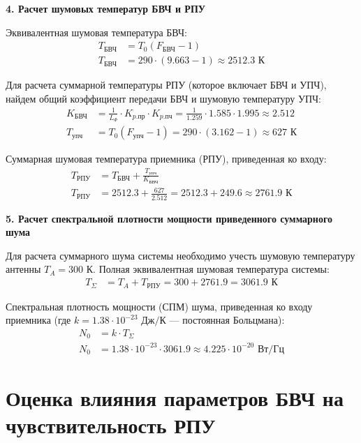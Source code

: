 \vspace{1em}
\textbf{4. Расчет шумовых температур БВЧ и РПУ}

Эквивалентная шумовая температура БВЧ:
\begin{align*}
T_{\text{БВЧ}} &= T_0 (F_{\text{БВЧ}} - 1) \\
T_{\text{БВЧ}} &= 290 \cdot (9.663 - 1) \approx 2512.3 \text{ К}
\end{align*}

Для расчета суммарной температуры РПУ (которое включает БВЧ и УПЧ), найдем общий коэффициент передачи БВЧ и шумовую температуру УПЧ:
\begin{align*}
K_{\text{БВЧ}} &= \frac{1}{L_{\Phi}} \cdot K_{p.\text{пр}} \cdot K_{p.\text{пч}} = \frac{1}{1.259} \cdot 1.585 \cdot 1.995 \approx 2.512 \\
T_{\text{упч}} &= T_0 (F_{\text{упч}} - 1) = 290 \cdot (3.162 - 1) \approx 627 \text{ К}
\end{align*}

Суммарная шумовая температура приемника (РПУ), приведенная ко входу:
\begin{align*}
T_{\text{РПУ}} &= T_{\text{БВЧ}} + \frac{T_{\text{упч}}}{K_{\text{БВЧ}}} \\
T_{\text{РПУ}} &= 2512.3 + \frac{627}{2.512} = 2512.3 + 249.6 \approx 2761.9 \text{ К}
\end{align*}

\vspace{1em}
\textbf{5. Расчет спектральной плотности мощности приведенного суммарного шума}

Для расчета суммарного шума системы необходимо учесть шумовую температуру антенны $T_A = 300 \text{ К}$. Полная эквивалентная шумовая температура системы:
\begin{align*}
T_{\Sigma} &= T_A + T_{\text{РПУ}} = 300 + 2761.9 = 3061.9 \text{ К}
\end{align*}

Спектральная плотность мощности (СПМ) шума, приведенная ко входу приемника (где $k = 1.38 \cdot 10^{-23} \text{ Дж/К}$ — постоянная Больцмана):
\begin{align*}
N_0 &= k \cdot T_{\Sigma} \\
N_0 &= 1.38 \cdot 10^{-23} \cdot 3061.9 \approx 4.225 \cdot 10^{-20} \text{ Вт/Гц}
\end{align*}

\vspace{1em}
\section{Оценка влияния параметров БВЧ на чувствительность РПУ}

